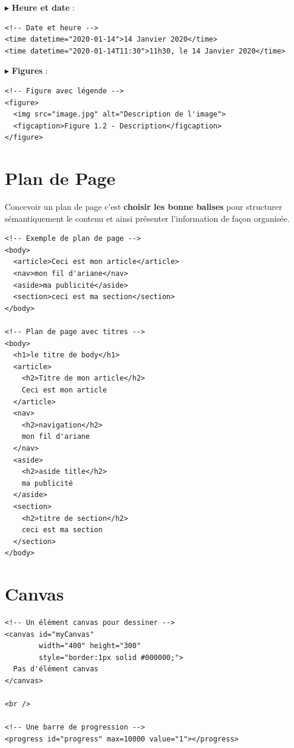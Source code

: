 \documentclass{report}
\begin{document}
\begin{multicols*}{2}
$\blacktriangleright$ \textbf{Heure et date} :
\begin{lstlisting}[style=HTMLDraculaDark]
<!-- Date et heure -->
<time datetime="2020-01-14">14 Janvier 2020</time>
<time datetime="2020-01-14T11:30">11h30, le 14 Janvier 2020</time>
\end{lstlisting}

$\blacktriangleright$ \textbf{Figures} :
\begin{lstlisting}[style=HTMLDraculaDark]
<!-- Figure avec légende -->
<figure>
  <img src="image.jpg" alt="Description de l'image">
  <figcaption>Figure 1.2 - Description</figcaption>
</figure>
\end{lstlisting}


\section{Plan de Page}
Concevoir un plan de page c'est \textbf{choisir les bonne balises} pour structurer 
sémantiquement le contenu et ainsi présenter l'information de façon organisée. 

\begin{lstlisting}[style=HTMLDraculaDark]
<!-- Exemple de plan de page -->
<body>
  <article>Ceci est mon article</article>
  <nav>mon fil d'ariane</nav>
  <aside>ma publicité</aside>
  <section>ceci est ma section</section>
</body>

<!-- Plan de page avec titres -->
<body>
  <h1>le titre de body</h1>
  <article>
    <h2>Titre de mon article</h2>
    Ceci est mon article
  </article>
  <nav>
    <h2>navigation</h2>
    mon fil d'ariane
  </nav>
  <aside>
    <h2>aside title</h2>
    ma publicité
  </aside>
  <section>
    <h2>titre de section</h2>
    ceci est ma section
  </section>
</body>
\end{lstlisting}


\section{Canvas}



\begin{lstlisting}[style=HTMLDraculaDark]
<!-- Un élément canvas pour dessiner -->
<canvas id="myCanvas"
        width="400" height="300"
        style="border:1px solid #000000;">
  Pas d'élément canvas
</canvas>

<br />

<!-- Une barre de progression -->
<progress id="progress" max=10000 value="1"></progress>
\end{lstlisting}


\end{multicols*}
\end{document}

